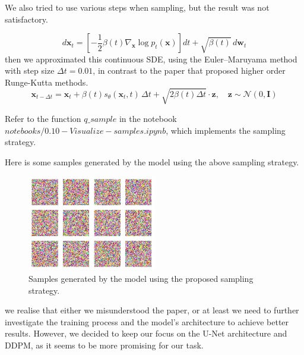 \documentclass[twocolumn,superscriptaddress,aps]{revtex4-1}
\begin{document}
We also tried to use various steps when sampling, but the result was not satisfactory.

$$
    d\mathbf{x}_t = \left[ -\frac{1}{2} \beta(t) \nabla_{\mathbf{x}} \log p_t(\mathbf{x}) \right] dt + \sqrt{\beta(t)}\, d\mathbf{w}_t
$$
then we approximated this continuous SDE, using the Euler–Maruyama method with step size $\Delta t = 0.01$, in contrast to the paper that proposed higher order Runge-Kutta methods.
$$
    \mathbf{x}_{t - \Delta t} = \mathbf{x}_t + \beta(t) s_\theta(\mathbf{x}_t, t)\, \Delta t + \sqrt{2 \beta(t) \Delta t} \cdot \mathbf{z}, \quad \mathbf{z} \sim \mathcal{N}(0, \mathbf{I})
$$

Refer to the function $q\_sample$ in the notebook $notebooks/0.10-Visualize-samples.ipynb$, which implements the sampling strategy.

\newpage
Here is some samples generated by the model using the above sampling strategy.
\begin{figure}
    \centering
    \includegraphics[width=0.5\textwidth]{figures/score-based-sampling.png}
    \caption{Samples generated by the model using the proposed sampling strategy.}
    \label{fig:sample_generated}
\end{figure}

we realise that either we misunderstood the paper, or at least we need to further investigate the training process and the model's architecture to achieve better results. However, we decided to keep our focus on the U-Net architecture and DDPM, as it seems to be more promising for our task.

\newpage
\end{document}
